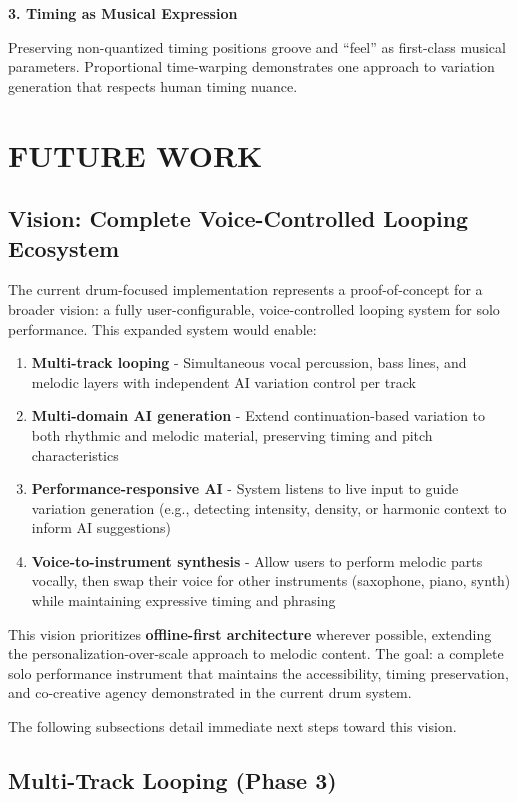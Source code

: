 \documentclass{aimc2026}
\begin{document}
\textbf{3. Timing as Musical Expression}

Preserving non-quantized timing positions groove and ``feel'' as first-class musical parameters. Proportional time-warping demonstrates one approach to variation generation that respects human timing nuance.


\section{FUTURE WORK}
\label{sec:future_work}

\subsection{Vision: Complete Voice-Controlled Looping Ecosystem}

The current drum-focused implementation represents a proof-of-concept for a broader vision: a fully user-configurable, voice-controlled looping system for solo performance. This expanded system would enable:

\begin{enumerate}
\item \textbf{Multi-track looping} - Simultaneous vocal percussion, bass lines, and melodic layers with independent AI variation control per track
\item \textbf{Multi-domain AI generation} - Extend continuation-based variation to both rhythmic and melodic material, preserving timing and pitch characteristics
\item \textbf{Performance-responsive AI} - System listens to live input to guide variation generation (e.g., detecting intensity, density, or harmonic context to inform AI suggestions)
\item \textbf{Voice-to-instrument synthesis} - Allow users to perform melodic parts vocally, then swap their voice for other instruments (saxophone, piano, synth) while maintaining expressive timing and phrasing
\end{enumerate}

This vision prioritizes \textbf{offline-first architecture} wherever possible, extending the personalization-over-scale approach to melodic content. The goal: a complete solo performance instrument that maintains the accessibility, timing preservation, and co-creative agency demonstrated in the current drum system.

The following subsections detail immediate next steps toward this vision.

\subsection{Multi-Track Looping (Phase 3)}
\end{document}
